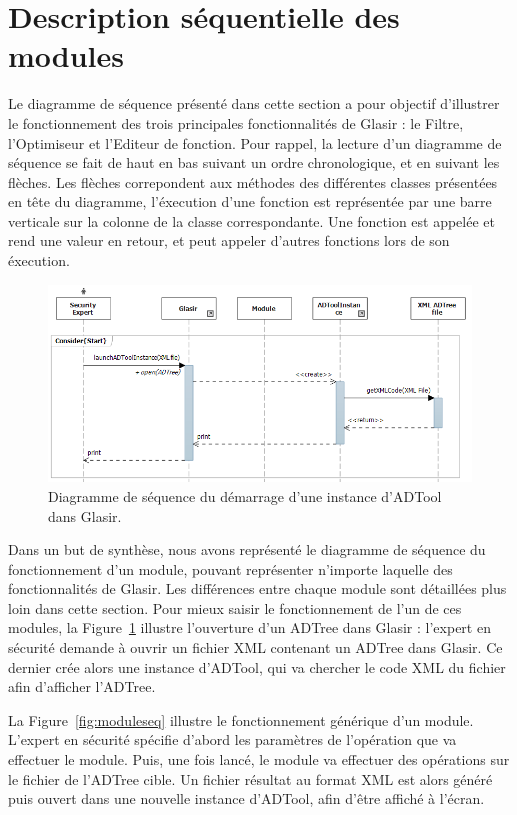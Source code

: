 \section{Description séquentielle des modules}
    \label{sec:modules}
    
Le diagramme de séquence présenté dans cette section a pour objectif d'illustrer le fonctionnement des trois principales fonctionnalités de Glasir : le Filtre, l'Optimiseur et l'Editeur de fonction. Pour rappel, la lecture d'un diagramme de séquence se fait de haut en bas suivant un ordre chronologique, et en suivant les flèches. Les flèches correpondent aux méthodes des différentes classes présentées en tête du diagramme, l'éxecution d'une fonction est représentée par une barre verticale sur la colonne de la classe correspondante. Une fonction est appelée et rend une valeur en retour, et peut appeler d'autres fonctions lors de son éxecution.

	    \begin{figure}[H]
	        \centering
	        \includegraphics[height=0.45\textwidth]{figure/startseqdiag.png}
	        \caption{Diagramme de séquence du démarrage d'une instance d'ADTool dans Glasir.}
	        \label{fig:start}
	    \end{figure}

Dans un but de synthèse, nous avons représenté le diagramme de séquence du fonctionnement d'un module, pouvant représenter n'importe laquelle des fonctionnalités de Glasir. Les différences entre chaque module sont détaillées plus loin dans cette section. Pour mieux saisir le fonctionnement de l'un de ces modules, la {\sc Figure}~{\ref{fig:start}} illustre l'ouverture d'un ADTree dans Glasir : l'expert en sécurité demande à ouvrir un fichier XML contenant un ADTree dans Glasir. Ce dernier crée alors une instance d'ADTool, qui va chercher le code XML du fichier afin d'afficher l'ADTree.

	    La {\sc Figure}~{\ref{fig:moduleseq}} illustre le fonctionnement générique d'un module. L'expert en sécurité spécifie d'abord les paramètres de l'opération que va effectuer le module. Puis, une fois lancé, le module va effectuer des opérations sur le fichier de l'ADTree cible. Un fichier résultat au format XML est alors généré puis ouvert dans une nouvelle instance d'ADTool, afin d'être affiché à l'écran. 

